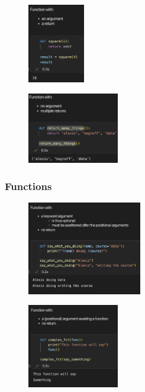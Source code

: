 \begin{frame}
   \begin{minipage}{0.20\linewidth}
      \begin{figure}[H]
         \includegraphics[width=2.5cm]{../images/illustrations/fct3.png}
      \end{figure}
      \begin{figure}[H]
         \includegraphics[width=4cm]{../images/illustrations/fct6.png}
      \end{figure}
   \end{minipage}
\end{frame}



\begin{frame}\frametitle{Functions}
   \begin{minipage}{0.48\linewidth}
      \begin{figure}[H]
         \includegraphics[width=5cm]{../images/illustrations/fct7.png}
      \end{figure}
   \end{minipage}
   \begin{minipage}{0.48\linewidth}
      \begin{figure}[H]
         \includegraphics[width=4cm]{../images/illustrations/fct8.png}
      \end{figure}
   \end{minipage}
\end{frame}


